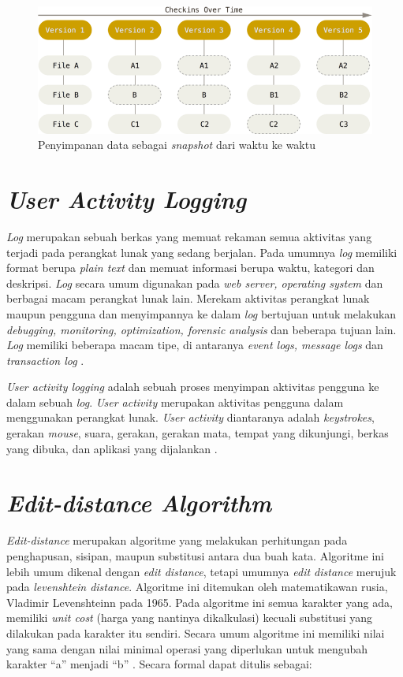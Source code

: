 \begin{figure}[tph]
  \centering
  \includegraphics[width=.7\linewidth]{img/snapshots}
  \caption{Penyimpanan data sebagai \emph{snapshot} dari waktu ke
    waktu~\parencite{chacon2014pro}}\label{fig:snapshots}
\end{figure}


\section{\emph{User Activity Logging}}

\emph{Log} merupakan sebuah berkas yang memuat rekaman semua aktivitas
yang terjadi pada perangkat lunak yang sedang berjalan. Pada
umumnya \emph{log} memiliki format berupa \emph{plain text} dan memuat
informasi berupa waktu, kategori dan deskripsi. \emph{Log} secara umum
digunakan pada \emph{web server, operating system} dan berbagai macam
perangkat lunak lain. Merekam aktivitas perangkat lunak maupun
pengguna dan menyimpannya ke dalam \emph{log} bertujuan untuk
melakukan \emph{debugging, monitoring, optimization, forensic
  analysis} dan beberapa tujuan lain. \emph{Log} memiliki beberapa
macam tipe, di antaranya \emph{event logs, message logs} dan
\emph{transaction log} \parencite{delarosa}.

\emph{User activity logging} adalah sebuah proses menyimpan aktivitas pengguna ke dalam
sebuah \emph{log}. \emph{User activity} merupakan aktivitas pengguna dalam menggunakan
perangkat lunak. \emph{User activity} diantaranya adalah \emph{keystrokes}, gerakan
\emph{mouse}, suara, gerakan, gerakan mata, tempat yang dikunjungi, berkas yang dibuka,
dan aplikasi yang dijalankan \parencite{macbeth2007logging}.

\section{\emph{Edit-distance Algorithm}}

\emph{Edit-distance} merupakan algoritme yang melakukan perhitungan
pada penghapusan, sisipan, maupun substitusi antara dua buah
kata. Algoritme ini lebih umum dikenal dengan \emph{edit
  distance}, tetapi umumnya \emph{edit distance} merujuk pada
\emph{levenshtein distance}. Algoritme ini ditemukan oleh
matematikawan rusia, Vladimir Levenshteinn pada 1965. Pada algoritme
ini semua karakter yang ada, memiliki \emph{unit cost} (harga yang
nantinya dikalkulasi) kecuali substitusi yang dilakukan pada karakter
itu sendiri. Secara umum algoritme ini memiliki nilai yang sama dengan
nilai minimal operasi yang diperlukan untuk mengubah karakter ``a''
menjadi ``b'' \parencite{navarro2001guided}. Secara formal dapat ditulis sebagai:

